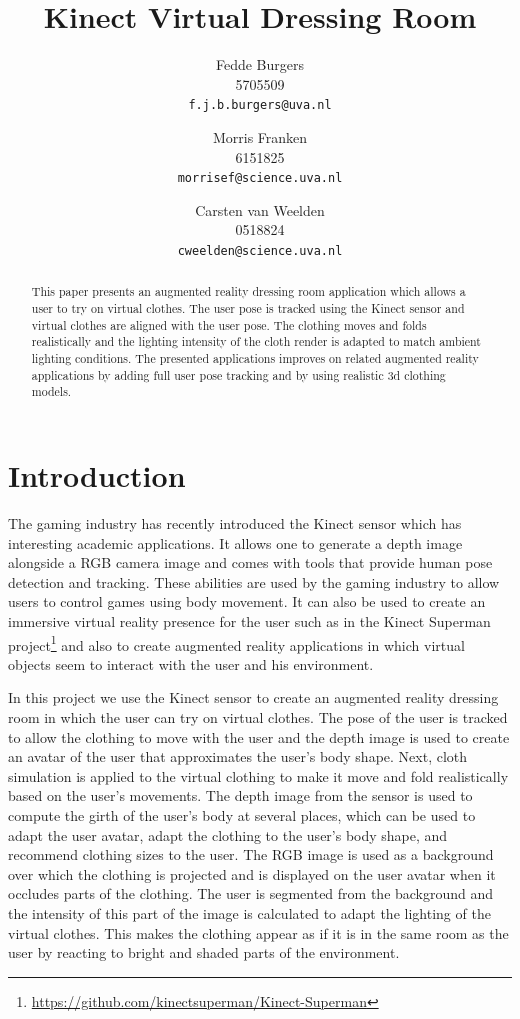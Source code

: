 \documentclass[a4paper]{article}
\title{Kinect Virtual Dressing Room}
\author{Fedde Burgers \\ 5705509 \\ \texttt{f.j.b.burgers@uva.nl} \and Morris Franken \\ 6151825 \\ \texttt{morrisef@science.uva.nl} \and Carsten van Weelden \\ 0518824 \\ \texttt{cweelden@science.uva.nl}}
\begin{document}
\maketitle

\begin{abstract}
This paper presents an augmented reality dressing room application which allows a user to try on virtual clothes. The user pose is tracked using the Kinect sensor and virtual clothes are aligned with the user pose. The clothing moves and folds realistically and the lighting intensity of the cloth render is adapted to match ambient lighting conditions. The presented applications improves on related augmented reality applications by adding full user pose tracking and by using realistic 3d clothing models. 
\end{abstract}

\par{}

\section{Introduction}
\label{sec:introduction}

The gaming industry has recently introduced the Kinect sensor which has interesting academic applications. It allows one to generate a depth image alongside a RGB camera image and comes with tools that provide human pose detection and tracking. These abilities are used by the gaming industry to allow users to control games using body movement. It can also be used to create an immersive virtual reality presence for the user such as in the Kinect Superman project\footnote{\url{https://github.com/kinectsuperman/Kinect-Superman}} and also to create augmented reality applications in which virtual objects seem to interact with the user and his environment.

In this project we use the Kinect sensor to create an augmented reality dressing room in which the user can try on virtual clothes. The pose of the user is tracked to allow the clothing to move with the user and the depth image is used to create an avatar of the user that approximates the user's body shape. Next, cloth simulation is applied to the virtual clothing to make it move and fold realistically based on the user's movements. The depth image from the sensor is used to compute the girth of the user's body at several places, which can be used to adapt the user avatar, adapt the clothing to the user's body shape, and recommend clothing sizes to the user. The RGB image is used as a background over which the clothing is projected and is displayed on the user avatar when it occludes parts of the clothing. The user is segmented from the background and the intensity of this part of the image is calculated to adapt the lighting of the virtual clothes. This makes the clothing appear as if it is in the same room as the user by reacting to bright and shaded parts of the environment.
\end{document}
